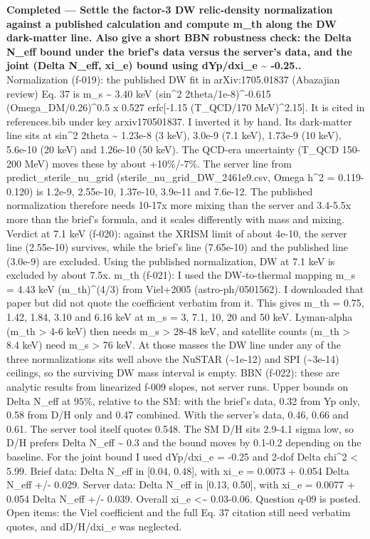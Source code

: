 \documentclass[11pt,a4paper]{article}
\begin{document}
\textbf{Completed --- Settle the factor-3 DW relic-density normalization against a published calculation and compute m\_th along the DW dark-matter line. Also give a short BBN robustness check: the Delta N\_eff bound under the brief's data versus the server's data, and the joint (Delta N\_eff, xi\_e) bound using dYp/dxi\_e \textasciitilde{} -0.25..} Normalization (f-019): the published DW fit in arXiv:1705.01837 (Abazajian review) Eq. 37 is m\_s \textasciitilde{} 3.40 keV (sin\textasciicircum{}2 2theta/1e-8)\textasciicircum{}-0.615 (Omega\_DM/0.26)\textasciicircum{}0.5 x 0.527 erfc[-1.15 (T\_QCD/170 MeV)\textasciicircum{}2.15]. It is cited in references.bib under key arxiv170501837. I inverted it by hand. Its dark-matter line sits at sin\textasciicircum{}2 2theta \textasciitilde{} 1.23e-8 (3 keV), 3.0e-9 (7.1 keV), 1.73e-9 (10 keV), 5.6e-10 (20 keV) and 1.26e-10 (50 keV). The QCD-era uncertainty (T\_QCD 150-200 MeV) moves these by about +10\%/-7\%. The server line from predict\_sterile\_nu\_grid (sterile\_nu\_grid\_DW\_2461e9.csv, Omega h\textasciicircum{}2 = 0.119-0.120) is 1.2e-9, 2.55e-10, 1.37e-10, 3.9e-11 and 7.6e-12. The published normalization therefore needs 10-17x more mixing than the server and 3.4-5.5x more than the brief's formula, and it scales differently with mass and mixing. Verdict at 7.1 keV (f-020): against the XRISM limit of about 4e-10, the server line (2.55e-10) survives, while the brief's line (7.65e-10) and the published line (3.0e-9) are excluded. Using the published normalization, DW at 7.1 keV is excluded by about 7.5x. m\_th (f-021): I used the DW-to-thermal mapping m\_s = 4.43 keV (m\_th)\textasciicircum{}(4/3) from Viel+2005 (astro-ph/0501562). I downloaded that paper but did not quote the coefficient verbatim from it. This gives m\_th = 0.75, 1.42, 1.84, 3.10 and 6.16 keV at m\_s = 3, 7.1, 10, 20 and 50 keV. Lyman-alpha (m\_th \textgreater{} 4-6 keV) then needs m\_s \textgreater{} 28-48 keV, and satellite counts (m\_th \textgreater{} 8.4 keV) need m\_s \textgreater{} 76 keV. At those masses the DW line under any of the three normalizations sits well above the NuSTAR (\textasciitilde{}1e-12) and SPI (\textasciitilde{}3e-14) ceilings, so the surviving DW mass interval is empty. BBN (f-022): these are analytic results from linearized f-009 slopes, not server runs. Upper bounds on Delta N\_eff at 95\%, relative to the SM: with the brief's data, 0.32 from Yp only, 0.58 from D/H only and 0.47 combined. With the server's data, 0.46, 0.66 and 0.61. The server tool itself quotes 0.548. The SM D/H sits 2.9-4.1 sigma low, so D/H prefers Delta N\_eff \textasciitilde{} 0.3 and the bound moves by 0.1-0.2 depending on the baseline. For the joint bound I used dYp/dxi\_e = -0.25 and 2-dof Delta chi\textasciicircum{}2 \textless{} 5.99. Brief data: Delta N\_eff in [0.04, 0.48], with xi\_e = 0.0073 + 0.054 Delta N\_eff +/- 0.029. Server data: Delta N\_eff in [0.13, 0.50], with xi\_e = 0.0077 + 0.054 Delta N\_eff +/- 0.039. Overall \textbar{}xi\_e\textbar{} \textless{}\textasciitilde{} 0.03-0.06. Question q-09 is posted. Open items: the Viel coefficient and the full Eq. 37 citation still need verbatim quotes, and dD/H/dxi\_e was neglected.
\end{document}
